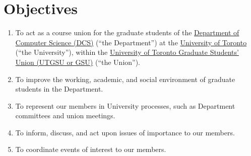 \section{Objectives}

\begin{enumerate}
      \item To act as a course union for the graduate students of the
            \href{https://web.cs.toronto.edu/}{Department of Computer Science (DCS)} (“the
            Department”) at the \href{https://www.utoronto.ca/}{University of Toronto}
            (“the University”), within the \href{https://utgsu.ca/}{University of Toronto
                  Graduate Students' Union (UTGSU or GSU)} (``the Union'').
      \item To improve the working, academic, and social environment of graduate students
            in the Department.
      \item To represent our members in University processes, such as Department committees
            and union meetings.
      \item To inform, discuss, and act upon issues of importance to our members.
      \item To coordinate events of interest to our members.
\end{enumerate}